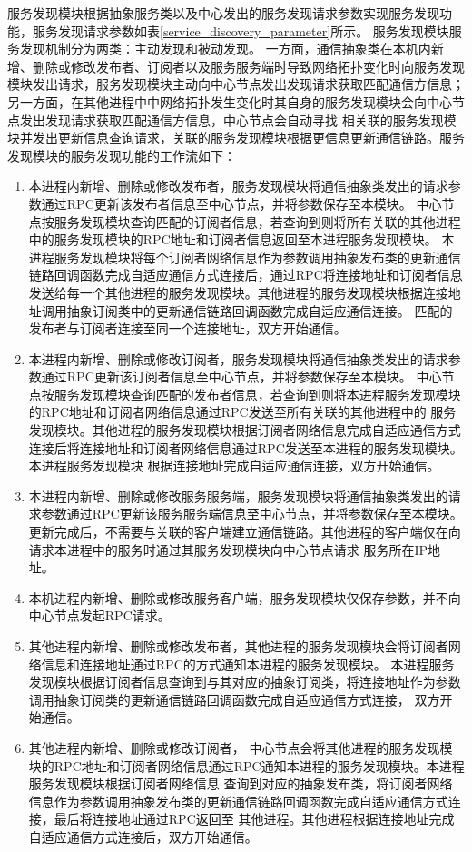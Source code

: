 服务发现模块根据抽象服务类以及中心发出的服务发现请求参数实现服务发现功能，服务发现请求参数如表\ref{service_discovery_parameter}所示。
服务发现模块服务发现机制分为两类：主动发现和被动发现。
一方面，通信抽象类在本机内新增、删除或修改发布者、订阅者以及服务服务端时导致网络拓扑变化时向服务发现模块发出请求，服务发现模块主动向中心节点发出发现请求获取匹配通信方信息；
另一方面，在其他进程中中网络拓扑发生变化时其自身的服务发现模块会向中心节点发出发现请求获取匹配通信方信息，中心节点会自动寻找
相关联的服务发现模块并发出更新信息查询请求，关联的服务发现模块根据更信息更新通信链路。服务发现模块的服务发现功能的工作流如下：
\begin{enumerate}
  \item 本进程内新增、删除或修改发布者，服务发现模块将通信抽象类发出的请求参数通过RPC更新该发布者信息至中心节点，并将参数保存至本模块。
  中心节点按服务发现模块查询匹配的订阅者信息，若查询到则将所有关联的其他进程中的服务发现模块的RPC地址和订阅者信息返回至本进程服务发现模块。
  本进程服务发现模块将每个订阅者网络信息作为参数调用抽象发布类的更新通信链路回调函数完成自适应通信方式连接后，通过RPC将连接地址和订阅者信息
  发送给每一个其他进程的服务发现模块。其他进程的服务发现模块根据连接地址调用抽象订阅类中的更新通信链路回调函数完成自适应通信连接。
  匹配的发布者与订阅者连接至同一个连接地址，双方开始通信。
  \item 本进程内新增、删除或修改订阅者，服务发现模块将通信抽象类发出的请求参数通过RPC更新该订阅者信息至中心节点，并将参数保存至本模块。
  中心节点按服务发现模块查询匹配的发布者信息，若查询到则将本进程服务发现模块的RPC地址和订阅者网络信息通过RPC发送至所有关联的其他进程中的
  服务发现模块。其他进程的服务发现模块根据订阅者网络信息完成自适应通信方式连接后将连接地址和订阅者网络信息通过RPC发送至本进程的服务发现模块。本进程服务发现模块
  根据连接地址完成自适应通信连接，双方开始通信。
  \item 本进程内新增、删除或修改服务服务端，服务发现模块将通信抽象类发出的请求参数通过RPC更新该服务服务端信息至中心节点，并将参数保存至本模块。
  更新完成后，不需要与关联的客户端建立通信链路。其他进程的客户端仅在向请求本进程中的服务时通过其服务发现模块向中心节点请求
  服务所在IP地址。
  \item 本机进程内新增、删除或修改服务客户端，服务发现模块仅保存参数，并不向中心节点发起RPC请求。
  \item 其他进程内新增、删除或修改发布者，其他进程的服务发现模块会将订阅者网络信息和连接地址通过RPC的方式通知本进程的服务发现模块。
  本进程服务发现模块根据订阅者信息查询到与其对应的抽象订阅类，将连接地址作为参数调用抽象订阅类的更新通信链路回调函数完成自适应通信方式连接，
  双方开始通信。
  \item 其他进程内新增、删除或修改订阅者，
  中心节点会将其他进程的服务发现模块的RPC地址和订阅者网络信息通过RPC通知本进程的服务发现模块。本进程服务发现模块根据订阅者网络信息
  查询到对应的抽象发布类，将订阅者网络信息作为参数调用抽象发布类的更新通信链路回调函数完成自适应通信方式连接，最后将连接地址通过RPC返回至
  其他进程。其他进程根据连接地址完成自适应通信方式连接后，双方开始通信。
\end{enumerate}

